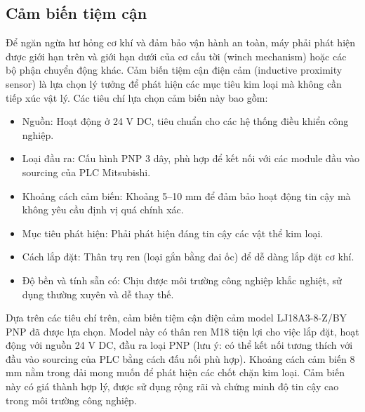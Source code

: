           \subsection{Cảm biến tiệm cận}
               \hspace*{0.6cm}Để ngăn ngừa hư hỏng cơ khí và đảm bảo vận hành an toàn, máy phải phát hiện được giới hạn trên và giới hạn dưới của cơ cấu tời (winch mechanism) hoặc các bộ phận chuyển động khác. Cảm biến tiệm cận điện cảm (inductive proximity sensor) là lựa chọn lý tưởng để phát hiện các mục tiêu kim loại mà không cần tiếp xúc vật lý. Các tiêu chí lựa chọn cảm biến này bao gồm:
               \begin{itemize}
                    \item Nguồn: Hoạt động ở 24 V DC, tiêu chuẩn cho các hệ thống điều khiển công nghiệp.
                    \item Loại đầu ra: Cấu hình PNP 3 dây, phù hợp để kết nối với các module đầu vào sourcing của PLC Mitsubishi.
                    \item Khoảng cách cảm biến: Khoảng 5–10 mm để đảm bảo hoạt động tin cậy mà không yêu cầu định vị quá chính xác.
                    \item Mục tiêu phát hiện: Phải phát hiện đáng tin cậy các vật thể kim loại.
                    \item Cách lắp đặt: Thân trụ ren (loại gắn bằng đai ốc) để dễ dàng lắp đặt cơ khí.
                    \item Độ bền và tính sẵn có: Chịu được môi trường công nghiệp khắc nghiệt, sử dụng thường xuyên và dễ thay thế.
               \end{itemize}
               \hspace*{0.6cm}Dựa trên các tiêu chí trên, cảm biến tiệm cận điện cảm model LJ18A3-8-Z/BY PNP đã được lựa chọn. Model này có thân ren M18 tiện lợi cho việc lắp đặt, hoạt động với nguồn 24 V DC, đầu ra loại PNP (lưu ý: có thể kết nối tương thích với đầu vào sourcing của PLC bằng cách đấu nối phù hợp). Khoảng cách cảm biến 8 mm nằm trong dải mong muốn để phát hiện các chốt chặn kim loại. Cảm biến này có giá thành hợp lý, được sử dụng rộng rãi và chứng minh độ tin cậy cao trong môi trường công nghiệp.
